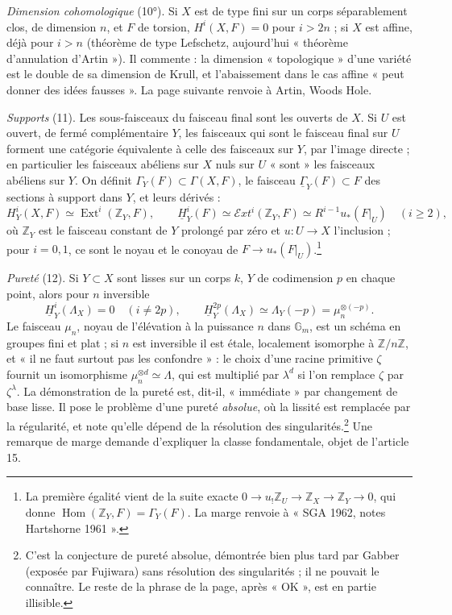 \documentclass[11pt,a4paper]{article}
\begin{document}
\emph{Dimension cohomologique} (10°). Si $X$ est de type fini sur un corps
séparablement clos, de dimension $n$, et $F$ de torsion, $H^{i}(X,F) = 0$ pour
$i > 2n$ ; si $X$ est affine, déjà pour $i > n$ (théorème de type Lefschetz,
aujourd'hui « théorème d'annulation d'Artin »). Il commente : la dimension
« topologique » d'une variété est le double de sa dimension de Krull, et
l'abaissement dans le cas affine « peut donner des idées fausses ». La page
suivante renvoie à Artin, Woods Hole.

\emph{Supports} (11). Les sous-faisceaux du faisceau final sont les ouverts de
$X$. Si $U$ est ouvert, de fermé complémentaire $Y$, les faisceaux qui sont le
faisceau final sur $U$ forment une catégorie équivalente à celle des faisceaux
sur $Y$, par l'image directe ; en particulier les faisceaux abéliens sur $X$
nuls sur $U$ « sont » les faisceaux abéliens sur $Y$. On définit
$\Gamma_{Y}(F) \subset \Gamma(X,F)$, le faisceau $\underline{\Gamma}_{Y}(F)
\subset F$ des sections à support dans $Y$, et leurs dérivés :
\[
  H^{i}_{Y}(X, F) \simeq \operatorname{Ext}^{i}(\mathbb{Z}_{Y}, F), \qquad
  \underline{H}^{i}_{Y}(F) \simeq \mathcal{E}xt^{i}(\mathbb{Z}_{Y}, F)
  \simeq R^{i-1}u_{*}(F|_{U}) \quad (i \geq 2),
\]
où $\mathbb{Z}_{Y}$ est le faisceau constant de $Y$ prolongé par zéro et $u : U
\to X$ l'inclusion ; pour $i = 0, 1$, ce sont le noyau et le conoyau de $F \to
u_{*}(F|_{U})$.\footnote{La première égalité vient de la suite exacte $0 \to
u_{!}\mathbb{Z}_{U} \to \mathbb{Z}_{X} \to \mathbb{Z}_{Y} \to 0$, qui donne
$\operatorname{Hom}(\mathbb{Z}_{Y}, F) = \Gamma_{Y}(F)$. La marge renvoie à
« SGA 1962, notes Hartshorne 1961 ».}

\emph{Pureté} (12). Si $Y \subset X$ sont lisses sur un corps $k$, $Y$ de
codimension $p$ en chaque point, alors pour $n$ inversible
\[
  \underline{H}^{i}_{Y}(\Lambda_{X}) = 0 \quad (i \neq 2p), \qquad
  \underline{H}^{2p}_{Y}(\Lambda_{X}) \simeq \Lambda_{Y}(-p) =
  \mu_{n}^{\otimes(-p)}.
\]
Le faisceau $\mu_{n}$, noyau de l'élévation à la puissance $n$ dans
$\mathbb{G}_{m}$, est un schéma en groupes fini et plat ; si $n$ est
inversible il est étale, localement isomorphe à $\mathbb{Z}/n\mathbb{Z}$, et
« il ne faut surtout pas les confondre » : le choix d'une racine primitive
$\zeta$ fournit un isomorphisme $\mu_{n}^{\otimes d} \simeq \Lambda$, qui est
multiplié par $\lambda^{d}$ si l'on remplace $\zeta$ par $\zeta^{\lambda}$. La
démonstration de la pureté est, dit-il, « immédiate » par changement de base
lisse. Il pose le
problème d'une pureté \emph{absolue}, où la lissité est remplacée par la
régularité, et note qu'elle dépend de la résolution des
singularités.\footnote{C'est la conjecture de pureté absolue, démontrée bien
plus tard par Gabber (exposée par Fujiwara) sans résolution des
singularités ; il ne pouvait le connaître. Le reste de la phrase de la page,
après « OK », est en partie illisible.} Une remarque de marge demande d'expliquer
la classe fondamentale, objet de l'article 15.
\end{document}
